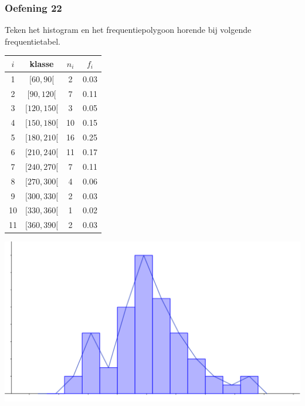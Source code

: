 \documentclass[13pt]{beamer}
\newenvironment{answer}
{\color{blue}}
{\color{black}}
\begin{document}
\begin{frame}
  \frametitle{Oefening 22}
  \begin{minipage}{0.60\linewidth}
    Teken het histogram en het frequentiepolygoon horende bij volgende frequentietabel.\\
  \end{minipage}
  \begin{minipage}{0.35\linewidth}
    \begin{center}
      \tiny
      \begin{tabular}{c|c|c|c}
        $i$ & klasse     & $n_i$ & $f_i$\\
        \hline
        1 & $[ 60,  90[$ &   2 &  0.03\\
        2 & $[ 90, 120[$ &   7 &  0.11\\
        3 & $[120, 150[$ &   3 &  0.05\\
        4 & $[150, 180[$ &  10 &  0.15\\
        5 & $[180, 210[$ &  16 &  0.25\\
        6 & $[210, 240[$ &  11 &  0.17\\
        7 & $[240, 270[$ &   7 &  0.11\\
        8 & $[270, 300[$ &   4 &  0.06\\
        9 & $[300, 330[$ &   2 &  0.03\\
        10 & $[330, 360[$ &   1 &  0.02\\
        11 & $[360, 390[$ &   2 &  0.03\\
      \end{tabular}
    \end{center}
  \end{minipage}
  \begin{answer}
    \includegraphics[width=\linewidth]{WachttijdenLesHistogram}
  \end{answer}
\end{frame}
\end{document}
